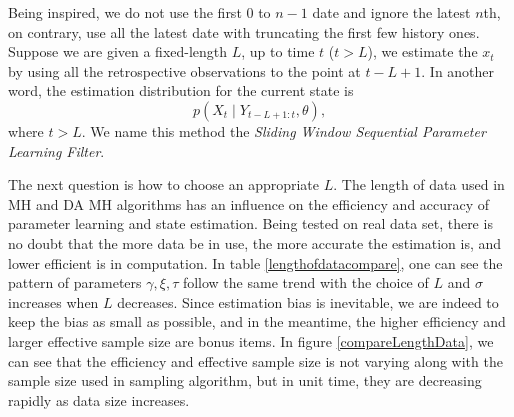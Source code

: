 Being inspired, we do not use the first $0$ to $n-1$ date and ignore the latest $n$th, on contrary, use all the latest date with truncating the first few history ones. Suppose we are given a fixed-length $L$, up to time $t$ ($t>L$),  we estimate the $x_t$ by using all the retrospective observations to the point at $t-L+1$. In another word, the estimation distribution for the current state is 
\begin{equation}
p(X_{t}\mid Y_{t-L+1:t},\theta),
\end{equation}
where $t>L$. We name this method the \textit{Sliding Window Sequential Parameter Learning Filter}. 

The next question is how to choose an appropriate $L$. The length of data used in MH and DA MH algorithms has an influence on the efficiency and accuracy of parameter learning and state estimation. Being tested on real data set, there is no doubt that the more data be in use, the more accurate the estimation is, and lower efficient is in computation. In table \ref{lengthofdatacompare}, one can see the pattern of parameters $\gamma,\xi,\tau$ follow the same trend with the choice of $L$ and $\sigma$ increases when $L$ decreases. Since estimation bias is inevitable, we are indeed to keep the bias as small as possible, and in the meantime, the higher efficiency and larger effective sample size are bonus items. In figure \ref{compareLengthData}, we can see that the efficiency and effective sample size is not varying along with the sample size used in sampling algorithm, but in unit time, they are decreasing rapidly as data size increases. 
